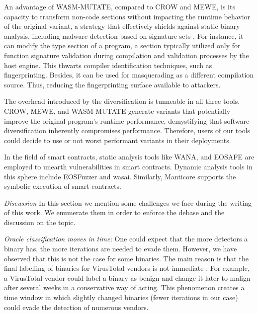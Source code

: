 An advantage of WASM-MUTATE, compared to CROW and MEWE, is its capacity to transform non-code sections without impacting the runtime behavior of the original variant, a strategy that effectively shields against static binary analysis, including malware detection based on signature sets \cite{EVASION}.
For instance, it can modify the type section of a \Wasm program, a section typically utilized only for function signature validation during compilation and validation processes by the host engine. 
This thwarts compiler identification techniques, such as fingerprinting.
Besides, it can be used for masquerading as a different compilation source.
Thus, reducing the fingerprinting surface available to attackers.


The overhead introduced by the diversification is tunneable in all three tools.
CROW, MEWE, and WASM-MUTATE generate variants that potentially improve the original program's runtime performance, demystifying that software diversification inherently compromises performance.
Therefore, users of our tools could decide to use or not worst performant variants in their deployments.


 In the field of smart contracts, static analysis tools like WANA\cite{wana}, and EOSAFE\cite{eosafe} are employed to unearth vulnerabilities in \Wasm smart contracts. 
Dynamic analysis tools in this sphere include EOSFuzzer\cite{EOSFuzzer} and wasai\cite{wasai}.
Similarly, Manticore supports the symbolic execution of \wasm smart contracts. 


\emph{Discussion}
In this section we mention some challenges we face during the writing of this work.
We enumerate them in order to enforce the debase and the discussion on the topic.

\emph{Oracle classification moves in time:}
One could expect that the more detectors a binary has, the more iterations are needed to evade them.
However, we have observed that this is not the case for some binaries.
The main reason is that the final labelling of binaries for VirusTotal vendors is not immediate \cite{251586}. 
For example, a VirusTotal vendor could label a binary as benign and change it later to malign after several weeks in a conservative way of acting.
This phenomenon creates a time window in which slightly changed binaries (fewer iterations in our case) could evade the detection of numerous vendors.

